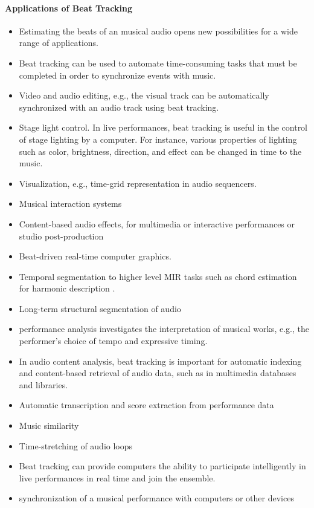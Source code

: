 \documentclass{scrartcl}
\begin{document}
\paragraph{Applications of Beat Tracking}
\begin{itemize}
\item Estimating the beats of an musical audio opens new possibilities for a wide range of applications. 
\item Beat tracking can be used to automate time-consuming tasks that must be completed in order to synchronize events with music. 
\item Video and audio editing, e.g., the visual track can be automatically synchronized with an audio track using beat tracking.
\item Stage light control. In live performances, beat tracking is useful in the control of stage lighting by a computer. For instance, various properties of lighting such as color, brightness, direction, and effect can be changed in time to the music.
\item Visualization, e.g., time-grid representation in audio sequencers.
\item Musical interaction systems \cite{Robertson2007}
\item Content-based audio effects, for multimedia or interactive performances or studio post-production
\item Beat-driven real-time computer graphics.
\item Temporal segmentation to higher level MIR tasks such as chord estimation for harmonic description \cite{Bello2005b}.
\item Long-term structural segmentation of audio \cite{Bartsch2005}
\item performance analysis investigates the interpretation of musical works, e.g., the performer's choice of tempo and expressive timing. 
\item In audio content analysis, beat tracking is important for automatic indexing and content-based retrieval of audio data, such as in multimedia databases and libraries.
\item Automatic transcription and score extraction from performance data 
\item Music similarity
\item Time-stretching of audio loops
\item Beat tracking can provide computers the ability to participate intelligently in live performances in real time and join the ensemble.
\item synchronization of a musical performance with computers or other devices

\end{itemize}
\end{document}
